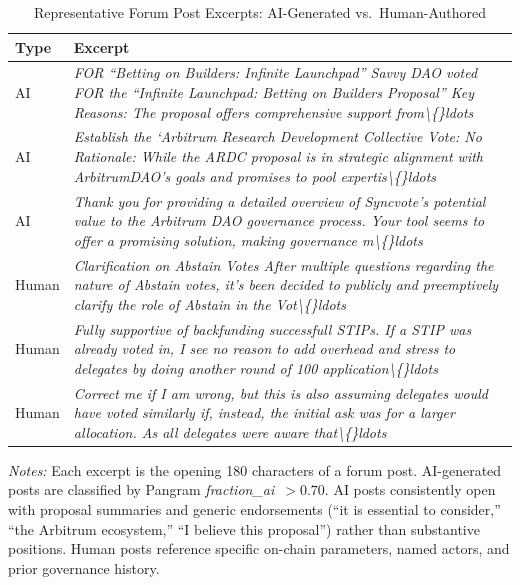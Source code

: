 \begin{table}[H]
\centering
\caption{Representative Forum Post Excerpts: AI-Generated vs.\ Human-Authored}
\label{tab:post_examples}
\begin{tabular}{p{1.2cm}p{12cm}}
\toprule
Type & Excerpt \\
\midrule
  AI & \textit{FOR “Betting on Builders: Infinite Launchpad” Savvy DAO voted FOR the “Infinite Launchpad: Betting on Builders Proposal” Key Reasons: The proposal offers comprehensive support from\textbackslash\{\}ldots} \\[2pt]
  AI & \textit{Establish the ‘Arbitrum Research Development Collective Vote: No Rationale: While the ARDC proposal is in strategic alignment with ArbitrumDAO’s goals and promises to pool expertis\textbackslash\{\}ldots} \\[2pt]
  AI & \textit{Thank you for providing a detailed overview of Syncvote’s potential value to the Arbitrum DAO governance process. Your tool seems to offer a promising solution, making governance m\textbackslash\{\}ldots} \\[2pt]
  \midrule
  Human & \textit{Clarification on Abstain Votes After multiple questions regarding the nature of Abstain votes, it’s been decided to publicly and preemptively clarify the role of Abstain in the Vot\textbackslash\{\}ldots} \\[2pt]
  Human & \textit{Fully supportive of backfunding successfull STIPs. If a STIP was already voted in, I see no reason to add overhead and stress to delegates by doing another round of 100 application\textbackslash\{\}ldots} \\[2pt]
  Human & \textit{Correct me if I am wrong, but this is also assuming delegates would have voted similarly if, instead, the initial ask was for a larger allocation. As all delegates were aware that\textbackslash\{\}ldots} \\[2pt]
\bottomrule
\end{tabular}
\begin{flushleft}
\small\textit{Notes:} Each excerpt is the opening 180 characters of a forum post.
AI-generated posts are classified by Pangram \textit{fraction\_ai}~$> 0.70$.
AI posts consistently open with proposal summaries and generic endorsements
(``it is essential to consider,'' ``the Arbitrum ecosystem,'' ``I believe this
proposal'') rather than substantive positions. Human posts reference specific
on-chain parameters, named actors, and prior governance history.
\end{flushleft}
\end{table}
